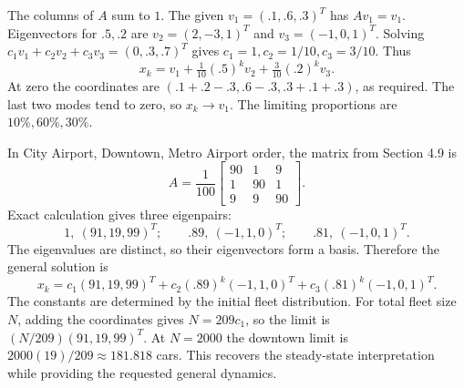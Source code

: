 The columns of $A$ sum to $1$. The given $v_1=(.1,.6,.3)^T$
has $Av_1=v_1$. Eigenvectors for $.5,.2$ are
$v_2=(2,-3,1)^T$ and $v_3=(-1,0,1)^T$.
Solving $c_1v_1+c_2v_2+c_3v_3=(0,.3,.7)^T$ gives
$c_1=1,c_2=1/10,c_3=3/10$. Thus
\[x_k=v_1+\tfrac1{10}(.5)^kv_2+\tfrac3{10}(.2)^kv_3.\]
At zero the coordinates are $(.1+.2-.3,.6-.3,.3+.1+.3)$,
as required. The last two modes tend to zero, so $x_k\to v_1$.
The limiting proportions are $10\%,60\%,30\%$.

In City Airport, Downtown, Metro Airport order, the matrix from
Section 4.9 is
\[A=\frac1{100}\begin{bmatrix}90&1&9\\1&90&1\\9&9&90\end{bmatrix}.\]
Exact calculation gives three eigenpairs:
\[1,\ (91,19,99)^T;\qquad .89,\ (-1,1,0)^T;
\qquad .81,\ (-1,0,1)^T.\]
The eigenvalues are distinct, so their eigenvectors form a basis.
Therefore the general solution is
\[x_k=c_1(91,19,99)^T+c_2(.89)^k(-1,1,0)^T
+c_3(.81)^k(-1,0,1)^T.\]
The constants are determined by the initial fleet distribution.
For total fleet size $N$, adding the coordinates gives $N=209c_1$,
so the limit is $(N/209)(91,19,99)^T$. At $N=2000$ the downtown
limit is $2000(19)/209\approx181.818$ cars. This recovers the
steady-state interpretation while providing the requested general dynamics.

